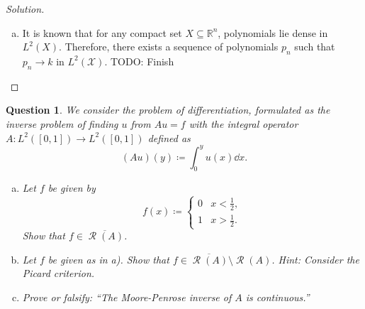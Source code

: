 \documentclass{article}
\theoremstyle{plain}
\newtheorem{question}{Question}
\theoremstyle{remark}
\newenvironment{solution}{\begin{proof}[Solution]\renewcommand\qedsymbol{}}{\end{proof}}
\newcommand{\Bb}{\mathbb}
\newcommand{\Cal}{\mathcal}
\newcommand{\RR}{\Bb R}
\newcommand\ceq\coloneqq %
\newcommand\TODO{{\color{red} TODO: }}
\newcommand\clos\overline
\newcommand\XX{\Cal X}
\DeclareMathOperator\Ran{\Cal R}
\begin{document}
\begin{solution}
\begin{enumerate}[(a)]
\item It is known that for any compact set $X \subseteq \RR^n$, polynomials lie dense in $L^2(X)$. Therefore, there exists a sequence of polynomials $p_n$ such that $p_n \to k$ in $L^2(\XX)$. 
 \TODO Finish
	\end{enumerate}
\end{solution}

\begin{question}
	We consider the problem of differentiation, formulated as the inverse problem of finding $u$ from $Au = f$ with the integral operator $A \colon L^2([0, 1]) \to L^2([0, 1])$ defined as
	\[
	(Au)(y) \ceq \int_0^y u(x) \dd{x}.
	\]
	
	\begin{enumerate}[(a)]
		\item Let $f$ be given by
		\[
		f(x) \ceq \begin{cases} 0 & x < \frac12, \\ 1 &x > \frac12. \end{cases}
		\]
		Show that $f \in \clos{\Ran(A)}$. 
		\item Let $f$ be given as in a). Show that $f \in \clos{\Ran(A)} \setminus \Ran(A)$. \emph{Hint: Consider the Picard criterion}. 
		
		\item Prove or falsify: ``The Moore-Penrose inverse of $A$ is continuous.''
	\end{enumerate}
\end{question}
\end{document}
